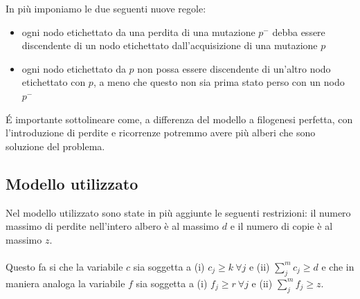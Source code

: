 \documentclass[12pt]{report}
\begin{document}
  In più imponiamo le due seguenti nuove regole:
  \begin{itemize}
    \item ogni nodo etichettato da una perdita di una mutazione $p^-$ debba essere discendente di un nodo etichettato dall'acquisizione di una mutazione $p$

    \item ogni nodo etichettato da $p$ non possa essere discendente di un'altro nodo etichettato con $p$, a meno che questo non sia prima stato perso con un nodo $p^-$
  \end{itemize}
  \'E importante sottolineare come, a differenza del modello a filogenesi perfetta, con l'introduzione di perdite e ricorrenze potremmo avere più alberi che sono soluzione del problema.

  \subsection{Modello utilizzato}
  Nel modello utilizzato sono state in più aggiunte le seguenti restrizioni: il numero massimo di perdite nell'intero albero è al massimo $d$ e il numero di copie è al massimo $z$.\\\\
  Questo fa si che la variabile $c$ sia soggetta a (i) ${c}_{j}\geq k \ \forall j$ e (ii) $\sum_{j}^m {c}_{j} \geq d$ e che in maniera analoga la variabile $f$ sia soggetta a (i) ${f}_{j}\geq r \ \forall j$ e (ii) $\sum_{j}^m {f}_{j} \geq z$.
\end{document}

